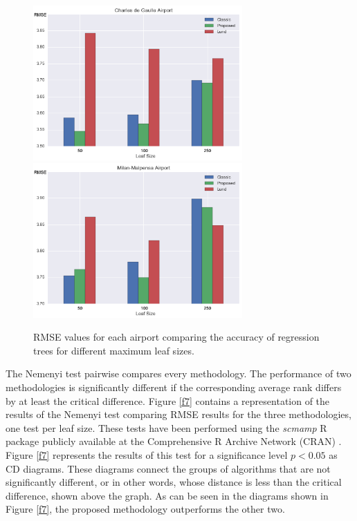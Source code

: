 \documentclass[times,twocolumn,final,authoryear]{elsarticle}
\begin{document}
\begin{figure}
  \includegraphics[width=8cm]{charles.png}
  \includegraphics[width=8cm]{milan.png}
\caption{RMSE values for each airport comparing the accuracy of regression trees for different maximum leaf sizes.}
\label{f6}
\end{figure}

The Nemenyi test pairwise compares every methodology. The performance of two methodologies is significantly different if the corresponding average rank differs by at least the critical difference. Figure \ref{f7} contains a representation of the results of the Nemenyi test comparing RMSE results for the three methodologies, one test per leaf size. These tests have been performed using the \textit{scmamp} R package publicly available at the Comprehensive R Archive Network (CRAN) \citep{Calvo2015}. Figure \ref{f7} represents the results of this test for a significance level $ p < 0.05 $ as CD diagrams.  These diagrams connect the groups of algorithms that are not significantly different, or in other words, whose distance is less than the critical difference, shown above the graph. As can be seen in the diagrams shown in Figure \ref{f7}, the proposed methodology outperforms the other two.
\end{document}
